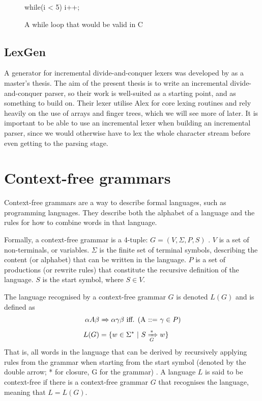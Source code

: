 \documentclass[a4paper,12pt,twosided]{report}
\renewcommand\cite{\citep}
\begin{document}
\begin{figure}[H]
\begin{code}
while(i < 5) {
    i++;
}
\end{code}
\caption{A while loop that would be valid in C}
\label{lexsample}
\end{figure}

\subsection{LexGen}
A generator for incremental divide-and-conquer lexers was developed by
\citet{divconqlex} as a master's thesis. The aim of the present thesis is to
write an incremental divide-and-conquer parser, so their work is well-suited as
a starting point, and as something to build on. Their lexer utilise Alex
\cite{alex} for core lexing routines and rely heavily on the use of arrays and
finger trees, which we will see more of later. It is important to be able to use
an incremental lexer when building an incremental parser, since we would
otherwise have to lex the whole character stream before even getting to the
parsing stage.

\section{Context-free grammars}
Context-free grammars are a way to describe formal languages, such as
programming languages. They describe both the alphabet of a language and the
rules for how to combine words in that language.

Formally, a context-free grammar is a 4-tuple: $G = (V, \Sigma, P, S)$
\cite[p.171]{automatabook}. $V$ is a set of non-terminals, or variables. $\Sigma$ is
the finite set of terminal symbols, describing the content (or alphabet) that
can be written in the language. $P$ is a set of productions (or rewrite rules)
that constitute the recursive definition of the language. $S$ is the start
symbol, where $S \in V$. 

The language recognised by a context-free grammar $G$ is denoted $L(G)$ and is
defined as 
\begin{align*}
\alpha A \beta & \xRightarrow\ \alpha \gamma \beta \text{ iff. (A ::= }\gamma \in P) \\
L(G) &= \{w \in \Sigma^* \ |\  S \xRightarrow[G]{*} w\}
\end{align*}
That is, all words in the language that can be derived by recursively applying
rules from the grammar when starting from the start symbol (denoted by the
double arrow; * for closure, G for the grammar) \cite[p.  177]{automatabook}. A
language $L$ is said to be context-free if there is a context-free grammar $G$
that recognises the language, meaning that $L = L(G)$.
\end{document}
